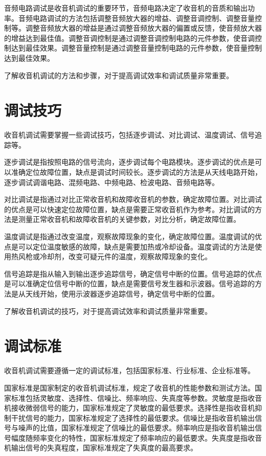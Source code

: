 \documentclass[12pt,UTF8]{ctexbook}
\begin{document}
音频电路调试是收音机调试的重要环节，音频电路决定了收音机的音质和输出功率。音频电路调试的方法包括调整音频放大器的增益、调整音调控制、调整音量控制等。调整音频放大器的增益是通过调整音频放大器的偏置或反馈，使音频放大器的增益达到最佳值。调整音调控制是通过调整音调控制电路的元件参数，使音调控制达到最佳效果。调整音量控制是通过调整音量控制电路的元件参数，使音量控制达到最佳效果。

了解收音机调试的方法和步骤，对于提高调试效率和调试质量非常重要。

\section{调试技巧}

收音机调试需要掌握一些调试技巧，包括逐步调试、对比调试、温度调试、信号追踪等。

逐步调试是指按照电路的信号流向，逐步调试每个电路模块。逐步调试的优点是可以准确定位故障位置，缺点是调试时间较长。逐步调试的方法是从天线电路开始，逐步调试调谐电路、混频电路、中频电路、检波电路、音频电路等。

对比调试是指通过对比正常收音机和故障收音机的参数，确定故障位置。对比调试的优点是可以快速定位故障位置，缺点是需要正常收音机作为参考。对比调试的方法是测量正常收音机和故障收音机的关键参数，对比分析，确定故障位置。

温度调试是指通过改变温度，观察故障现象的变化，确定故障位置。温度调试的优点是可以定位温度敏感的故障，缺点是需要加热或冷却设备。温度调试的方法是使用热风枪或冷却剂，改变可疑元件的温度，观察故障现象的变化。

信号追踪是指从输入到输出逐步追踪信号，确定信号中断的位置。信号追踪的优点是可以准确定位信号中断的位置，缺点是需要信号发生器和示波器。信号追踪的方法是从天线开始，使用示波器逐步追踪信号，确定信号中断的位置。

了解收音机调试的技巧，对于提高调试效率和调试质量非常重要。

\section{调试标准}

收音机调试需要遵循一定的调试标准，包括国家标准、行业标准、企业标准等。

国家标准是国家制定的收音机调试标准，规定了收音机的性能参数和测试方法。国家标准包括灵敏度、选择性、信噪比、频率响应、失真度等参数。灵敏度是指收音机接收微弱信号的能力，国家标准规定了灵敏度的最低要求。选择性是指收音机抑制干扰信号的能力，国家标准规定了选择性的最低要求。信噪比是指收音机输出信号与噪声的比值，国家标准规定了信噪比的最低要求。频率响应是指收音机输出信号幅度随频率变化的特性，国家标准规定了频率响应的最低要求。失真度是指收音机输出信号的失真程度，国家标准规定了失真度的最高要求。
\end{document}
